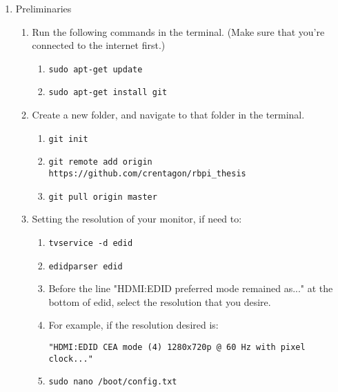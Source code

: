 \begin{enumerate}
    \item Preliminaries
        \begin{enumerate}[label*=\arabic*.]
            \item Run the following commands in the terminal. (Make sure that you're connected to the internet first.)
                \begin{enumerate}[label*=\arabic*.]
                    \item \texttt{sudo apt-get update}
                    \item \texttt{sudo apt-get install git}
                \end{enumerate}
            
            \item Create a new folder, and navigate to that folder in the terminal.
                \begin{enumerate}[label*=\arabic*.]
                    \item \texttt{git init}
                    \item \texttt{git remote add origin https://github.com/crentagon/rbpi_thesis}
                    \item \texttt{git pull origin master}
                \end{enumerate}
                
            \item Setting the resolution of your monitor, if need to:
                \begin{enumerate}[label*=\arabic*.]
                    \item \texttt{tvservice -d edid}
                    \item \texttt{edidparser edid}
                    \item Before the line "HDMI:EDID preferred mode remained as..." at the bottom of edid, select the resolution that you desire.
                    \item For example, if the resolution desired is:
                    
                    \texttt{"HDMI:EDID CEA mode (4) 1280x720p @ 60 Hz with pixel clock..."}
                    
                    \item \texttt{sudo nano /boot/config.txt}
                    

\end{enumerate}
\end{enumerate}
\end{enumerate}

